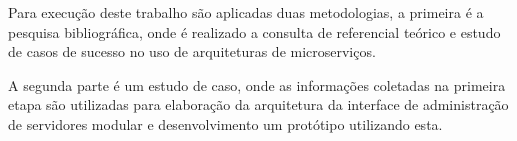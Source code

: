 Para execução deste trabalho são aplicadas duas metodologias, a primeira
é a pesquisa bibliográfica, onde é realizado a consulta de referencial
teórico e estudo de casos de sucesso no uso de arquiteturas de microserviços.

A segunda parte é um estudo de caso, onde as informações coletadas
na primeira etapa são utilizadas para elaboração da arquitetura da interface
de administração de servidores modular e desenvolvimento um protótipo
utilizando esta.
